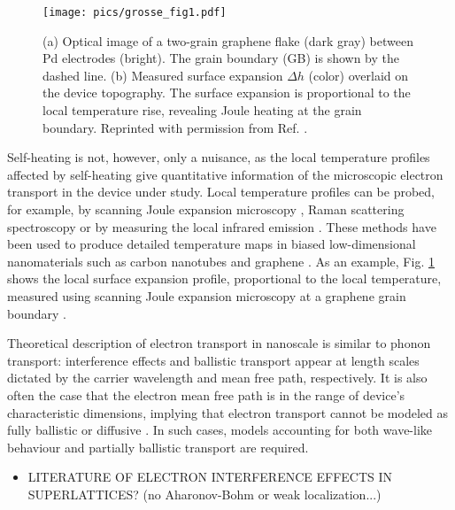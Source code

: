 \begin{figure}
\begin{center}
 \texttt{[image: pics/grosse\_fig1.pdf]}
 \caption{(a) Optical image of a two-grain graphene flake (dark gray) between Pd electrodes (bright). The grain boundary (GB) is shown by the dashed line. (b) Measured surface expansion $\Delta h$ (color) overlaid on the device topography. The surface expansion is proportional to the local temperature rise, revealing Joule heating at the grain boundary. Reprinted with permission from Ref. \cite{grosse14}.}
\label{fig:intro_grosse}
\end{center}
\end{figure} 

Self-heating is not, however, only a nuisance, as the local temperature profiles affected by self-heating give quantitative information of the microscopic electron transport in the device under study. Local temperature profiles can be probed, for example, by scanning Joule expansion microscopy \cite{varesi98}, Raman scattering spectroscopy \cite{calizo07} or by measuring the local infrared emission \cite{bae10}. These methods have been used to produce detailed temperature maps in biased low-dimensional nanomaterials such as carbon nanotubes \cite{estrada11,xie12} and graphene \cite{bae10,freitag09,chae10,freitag10}. As an example, Fig. \ref{fig:intro_grosse} shows the local surface expansion profile, proportional to the local temperature, measured using scanning Joule expansion microscopy at a graphene grain boundary \cite{grosse14}.

Theoretical description of electron transport in nanoscale is similar to phonon transport: interference effects and ballistic transport appear at length scales dictated by the carrier wavelength and mean free path, respectively. \cite{} It is also often the case that the electron mean free path is in the range of device's characteristic dimensions, implying that electron transport cannot be modeled as fully ballistic or diffusive \cite{}. In such cases, models accounting for both wave-like behaviour and partially ballistic transport are required. 

\begin{itemize}
 \item LITERATURE OF ELECTRON INTERFERENCE EFFECTS IN SUPERLATTICES? (no Aharonov-Bohm or weak localization...)
\end{itemize}



